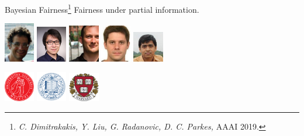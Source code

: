 \begin{frame}
  \begin{block}{Bayesian Fairness\footnote{\emph{C. Dimitrakakis, Y. Liu, G. Radanovic, D. C. Parkes,} AAAI 2019.}}
    \Large{
      Fairness under partial information.
    }
  \end{block}

  \begin{center}
  \includegraphics[width=0.1\textwidth]{../figures/me-recent} \hspace{1em}
  \includegraphics[width=0.1\textwidth]{../figures/yang} \hspace{1em}
  \includegraphics[width=0.1\textwidth]{../figures/parkes} \hspace{1em}
  \includegraphics[width=0.1\textwidth]{../figures/goran} \hspace{1em}
  \includegraphics[width=0.1\textwidth]{../figures/deb} 

    \includegraphics[width=0.1\textwidth]{../figures/oslo}
    \hspace{1em}
    \includegraphics[width=0.1\textwidth]{../figures/ucsc}
    \hspace{1em}
    \hspace{0.1\textwidth}
    \hspace{1em}
    \includegraphics[width=0.1\textwidth]{../figures/harvard}
    \hspace{1em}
    \hspace{0.1\textwidth}
  \end{center}
  

\end{frame}
